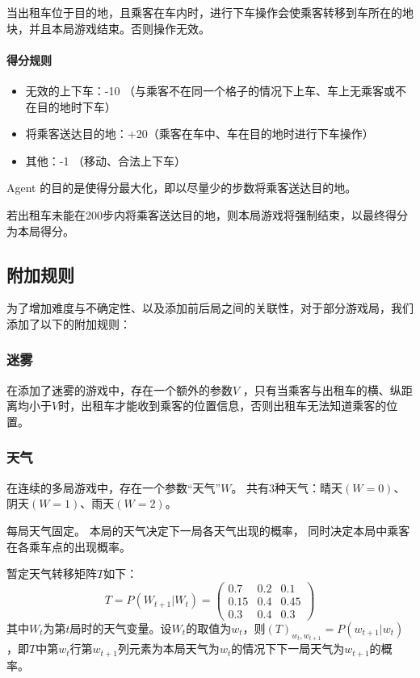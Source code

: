 \documentclass{article}
\begin{document}
\begin{CJK}{UTF8}{gbsn}
​当出租车位于目的地，且乘客在车内时，进行下车操作会使乘客转移到车所在的地块，并且本局游戏结束。否则操作无效。 

\paragraph{\textbf{得分规则}}
\begin{itemize}
\item 无效的上下车：-10 （与乘客不在同一个格子的情况下上车、车上无乘客或不在目的地时下车） 

\item 将乘客送达目的地：+20（乘客在车中、车在目的地时进行下车操作） 

\item 其他：-1 （移动、合法上下车） 
\end{itemize}
Agent 的目的是使得分最大化，即以尽量少的步数将乘客送达目的地。 

若出租车未能在200步内将乘客送达目的地，则本局游戏将强制结束，以最终得分为本局得分。

\subsection{附加规则}
为了增加难度与不确定性、以及添加前后局之间的关联性，对于部分游戏局，我们添加了以下的附加规则：

\subsubsection{迷雾}
在添加了迷雾的游戏中，存在一个额外的参数$V$ ，只有当乘客与出租车的横、纵距离均小于$V$时，出租车才能收到乘客的位置信息，否则出租车无法知道乘客的位置。 

\subsubsection{天气} 
在连续的多局游戏中，存在一个参数“天气”$W$。
共有3种天气：晴天$(W=0)$、阴天$(W=1)$、雨天$(W=2)$。

每局天气固定。
本局的天气决定下一局各天气出现的概率，
同时决定本局中乘客在各乘车点的出现概率。

暂定天气转移矩阵$T$如下：
$$T=P(W_{t+1}|W_t)=\begin{pmatrix}
  0.7 & 0.2 & 0.1 \\
  0.15 & 0.4 & 0.45 \\
  0.3 & 0.4 & 0.3
\end{pmatrix}$$
其中$W_t$为第$t$局时的天气变量。设$W_t$的取值为$w_t$，则$(T)_{w_t,w_{t+1}}=P(w_{t+1}|w_t)$，即$T$中第$w_t$行第$w_{t+1}$列元素为本局天气为$w_t$的情况下下一局天气为$w_{t+1}$的概率。


\end{CJK}
\end{document}
